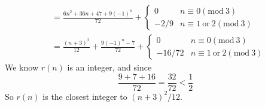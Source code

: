 \begin{example}
\begin{align*}
        &= \frac{6n^2 + 36n + 47 + 9(-1)^n}{72} + \begin{cases} 0 & n \equiv 0 (\text{mod}\ 3) \\ -2/9 & n \equiv 1\ \text{or}\ 2 (\text{mod}\ 3) \end{cases}\\
        &= \frac{(n + 3)^2}{12} + \frac{9 (-1)^n - 7}{72} + \begin{cases} 0 & n \equiv 0 (\text{mod}\ 3) \\ -16/72 & n \equiv 1\ \text{or}\ 2 (\text{mod}\ 3) \end{cases}    \end{align*}
        We know $r(n)$ is an integer, and since
        \[ \frac{9 + 7 + 16}{72} = \frac{32}{72} < \frac{1}{2} \]
        So $r(n)$ is the closest integer to $(n + 3)^2/12$.
\end{example}

